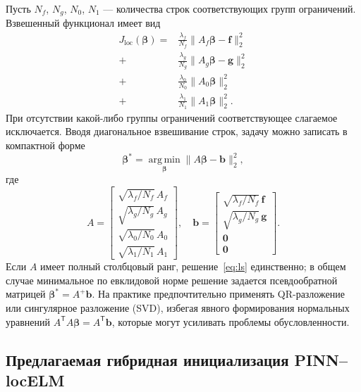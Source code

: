 \documentclass{misisarticle}
\begin{document}
Пусть $N_f$, $N_g$, $N_0$, $N_1$ --- количества строк соответствующих групп ограничений. Взвешенный функционал имеет вид
\begin{equation}
\begin{aligned}
 J_{\mathrm{loc}}(\boldsymbol\beta)=
 &\frac{\lambda_f}{N_f}\|A_f\boldsymbol\beta-\mathbf f\|_2^2\\
 +&\frac{\lambda_g}{N_g}\|A_g\boldsymbol\beta-\mathbf g\|_2^2\\
 +&\frac{\lambda_0}{N_0}\|A_0\boldsymbol\beta\|_2^2\\
 +&\frac{\lambda_1}{N_1}\|A_1\boldsymbol\beta\|_2^2.
\end{aligned}
\label{eq:locloss}
\end{equation}
При отсутствии какой-либо группы ограничений соответствующее слагаемое исключается. Вводя диагональное взвешивание строк, задачу можно записать в компактной форме
\begin{equation}
 \boldsymbol\beta^{\ast}=
 \operatorname*{arg\,min}_{\boldsymbol\beta}
 \|A\boldsymbol\beta-\mathbf b\|_2^2,
\label{eq:ls}
\end{equation}
где
\begin{equation}
 A=\begin{bmatrix}
 \sqrt{\lambda_f/N_f}\,A_f\\
 \sqrt{\lambda_g/N_g}\,A_g\\
 \sqrt{\lambda_0/N_0}\,A_0\\
 \sqrt{\lambda_1/N_1}\,A_1
 \end{bmatrix},\quad
 \mathbf b=\begin{bmatrix}
 \sqrt{\lambda_f/N_f}\,\mathbf f\\
 \sqrt{\lambda_g/N_g}\,\mathbf g\\
 \mathbf 0\\\mathbf 0
 \end{bmatrix}.
\label{eq:stacked}
\end{equation}
Если $A$ имеет полный столбцовый ранг, решение~\eqref{eq:ls} единственно; в общем случае минимальное по евклидовой норме решение задается псевдообратной матрицей $\boldsymbol\beta^{\ast}=A^{+}\mathbf b$. На практике предпочтительно применять QR-разложение или сингулярное разложение (SVD), избегая явного формирования нормальных уравнений $A^{\mathsf T}A\boldsymbol\beta=A^{\mathsf T}\mathbf b$, которые могут усиливать проблемы обусловленности.

\subsection{Предлагаемая гибридная инициализация PINN--locELM}
\end{document}
